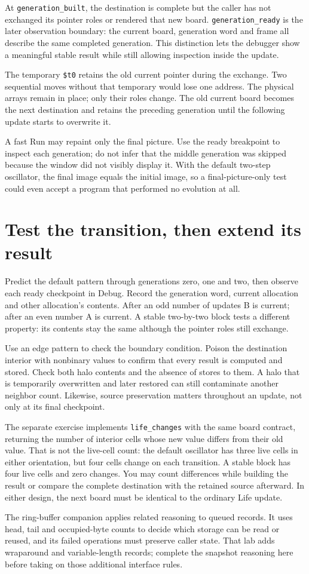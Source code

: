 At \texttt{generation\_built}, the destination is complete but the caller has not
exchanged its pointer roles or rendered that new board. \texttt{generation\_ready}
is the later observation boundary: the current board, generation word and frame
all describe the same completed generation. This distinction lets the debugger
show a meaningful stable result while still allowing inspection inside the update.

The temporary \texttt{\$t0} retains the old current pointer during the exchange.
Two sequential moves without that temporary would lose one address. The physical
arrays remain in place; only their roles change. The old current board becomes the
next destination and retains the preceding generation until the following update
starts to overwrite it.

A fast Run may repaint only the final picture. Use the ready breakpoint to inspect
each generation; do not infer that the middle generation was skipped because the
window did not visibly display it. With the default two-step oscillator, the final
image equals the initial image, so a final-picture-only test could even accept a
program that performed no evolution at all.

\section{Test the transition, then extend its result}

Predict the default pattern through generations zero, one and two, then observe
each ready checkpoint in Debug. Record the generation word, current allocation
and other allocation's contents. After an odd number of updates B is current;
after an even number A is current. A stable two-by-two block tests a different
property: its contents stay the same although the pointer roles still exchange.

Use an edge pattern to check the boundary condition. Poison the destination
interior with nonbinary values to confirm that every result is computed and
stored. Check both halo contents and the absence of stores to them. A halo that
is temporarily overwritten and later restored can still contaminate another
neighbor count. Likewise, source preservation matters throughout an update, not
only at its final checkpoint.

The separate exercise implements \texttt{life\_changes} with the same board
contract, returning the number of interior cells whose new value differs from
their old value. That is not the live-cell count: the default oscillator has
three live cells in either orientation, but four cells change on each transition.
A stable block has four live cells and zero changes. You may count differences
while building the result or compare the complete destination with the retained
source afterward. In either design, the next board must be identical to the
ordinary Life update.

The ring-buffer companion applies related reasoning to queued records. It uses
head, tail and occupied-byte counts to decide which storage can be read or reused,
and its failed operations must preserve caller state. That lab adds wraparound
and variable-length records; complete the snapshot reasoning here before taking
on those additional interface rules.
